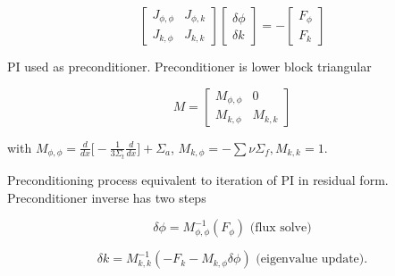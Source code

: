 \documentclass{article}
\begin{document}
\[
\begin{bmatrix}
J_{\phi,\phi} & J_{\phi,k} \\
J_{k,\phi} & J_{k,k}
\end{bmatrix}
\begin{bmatrix}
\delta \phi \\ \delta k
\end{bmatrix}
= 
-\begin{bmatrix}
F_{\phi} \\ F_{k}
\end{bmatrix}
\]

PI used as preconditioner. Preconditioner is lower block triangular

\[
M = 
\begin{bmatrix}
M_{\phi,\phi} & 0 \\ 
M_{k,\phi} & M_{k,k}
\end{bmatrix}
\]

with $M_{\phi,\phi} = \frac{d}{dx} \bigg [ -\frac{1}{3\Sigma_t} \frac{d}{dx} \bigg ] + \Sigma_a$, $M_{k,\phi} = -\sum \nu \Sigma_f, M_{k,k} = 1$.

Preconditioning process equivalent to iteration of PI in residual form. Preconditioner inverse has two steps

\begin{equation*}
\delta \phi = M^{-1}_{\phi,\phi}(F_{\phi}) \text{ (flux solve})
\end{equation*}

\begin{equation*}
\delta k = M^{-1}_{k,k}(-F_k - M_{k,\phi} \delta \phi) \text{ (eigenvalue update)}.
\end{equation*}
\end{document}
